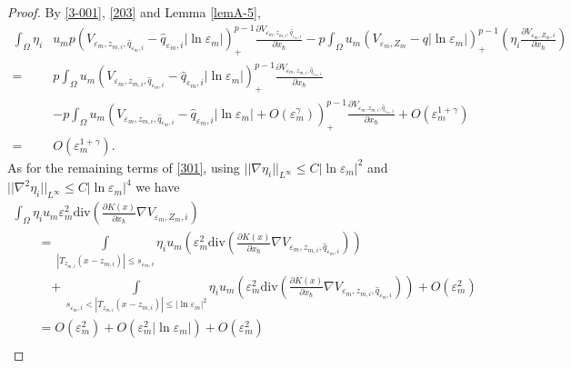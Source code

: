\documentclass[10pt,a4paper]{amsart}
\begin{document}
\begin{proof}
By \eqref{3-001}, \eqref{203} and Lemma \ref{lemA-5},  
\begin{equation}\label{302}
\begin{split}
\int_{\Omega}\eta_i&u_mp\left( V_{\varepsilon_m, z_{m,i}, \hat{q}_{\varepsilon_m,i}}-\hat{q}_{\varepsilon_m,i}|\ln\varepsilon_m|\right)^{p-1}_+\frac{\partial V_{\varepsilon_m, z_{m,i}, \hat{q}_{\varepsilon_m,i}}}{\partial x_\hbar}-  p\int_{\Omega}u_m\left (V_{\varepsilon_m, Z_m}-q|\ln\varepsilon_m|\right )^{p-1}_+\left( \eta_i\frac{\partial V_{\varepsilon_m, Z_{m},i}}{\partial x_\hbar}\right)\\
=&p\int_{\Omega}u_m\left( V_{\varepsilon_m, z_{m,i}, \hat{q}_{\varepsilon_m,i}}-\hat{q}_{\varepsilon_m,i}|\ln\varepsilon_m|\right)^{p-1}_+\frac{\partial V_{\varepsilon_m, z_{m,i}, \hat{q}_{\varepsilon_m,i}}}{\partial x_\hbar}\\
&-p\int_{\Omega}u_m\left( V_{\varepsilon_m, z_{m,i}, \hat{q}_{\varepsilon_m,i}}-\hat{q}_{\varepsilon_m,i}|\ln\varepsilon_m|+O\left( \varepsilon_m^\gamma\right) \right)^{p-1}_+\frac{\partial V_{\varepsilon_m, z_{m,i}, \hat{q}_{\varepsilon_m,i}}}{\partial x_\hbar}+O\left( \varepsilon_m^{1+\gamma}\right)\\
=&O\left( \varepsilon_m^{1+\gamma}\right).
\end{split}
\end{equation}
As for the remaining terms of \eqref{301}, %
using $ ||\nabla\eta_i||_{L^\infty}\leq C|\ln\varepsilon_m|^{2}$ and $ ||\nabla^2\eta_i||_{L^\infty}\leq C|\ln\varepsilon_m|^{4} $ we have
\begin{equation}\label{304}
\begin{array}{ll}
\int_{\Omega}\eta_iu_m\varepsilon_m^2\text{div}\left (\frac{\partial K(x)}{\partial x_\hbar}\nabla V_{\varepsilon_m, Z_{m},i}  \right )&\\
\qquad=\int\limits_{|T_{z_{m,i}}(x-z_{m,i})|\leq s_{\varepsilon_m,i}}\eta_iu_m \left( \varepsilon_m^2\text{div}\left( \frac{\partial K(x)}{\partial x_\hbar}\nabla V_{\varepsilon_m, z_{m,i}, \hat{q}_{\varepsilon_m,i}}\right)\right)&\\
\qquad\,\,\,\,\,+\int\limits_{ s_{\varepsilon_m,i}<|T_{z_{m,i}}(x-z_{m,i})|\leq |\ln\varepsilon_m|^{2}}
\eta_iu_m \left( \varepsilon_m^2\text{div}\left( \frac{\partial K(x)}{\partial x_\hbar}\nabla V_{\varepsilon_m, z_{m,i}, \hat{q}_{\varepsilon_m,i}}\right)\right)+O\left( \varepsilon_m^2\right)  &\\
\qquad=O\left(\varepsilon_m^2\right) +O\left (\varepsilon_m^2|\ln\varepsilon_m|\right )+O\left( \varepsilon_m^2\right)&\\

\end{array}
\end{equation}
\end{proof}
\end{document}
